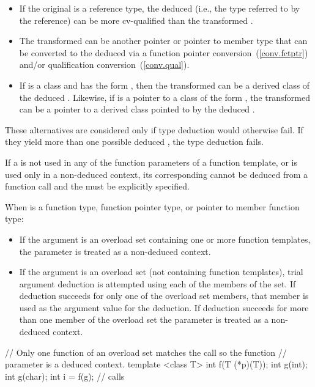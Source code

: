 \begin{itemize}
\item
If the original
is a reference type, the deduced
(i.e.,
the type referred to by the reference) can be more cv-qualified than
the transformed .
\item
The transformed 
can be another pointer or pointer to member type that can be converted
to the deduced
via a function pointer conversion~(\ref{conv.fctptr}) and/or
qualification conversion~(\ref{conv.qual}).

\item
If
is a class and
has the form
,
then
the transformed 
can be a derived class of the
deduced
.
Likewise, if
is a pointer to a class of the form
,
the transformed 
can be a pointer to a
derived class pointed to by the deduced
.
\end{itemize}

\pnum
These alternatives are considered only if type deduction would
otherwise fail.
If they yield more than one possible deduced
,
the type deduction fails.
\begin{note}
If a
is not used in any of the function parameters of a function template,
or is used only in a non-deduced context, its corresponding
cannot be deduced from a function call and the
must be explicitly specified.
\end{note}

\pnum
When
is a function type, function pointer type, or pointer to member
function type:
\begin{itemize}
\item
If the argument is an overload set containing one or more function templates,
the parameter is treated as a non-deduced context.
\item
If the argument is an overload set (not containing function templates), trial
argument deduction is attempted using each of the members of the set. If
deduction succeeds for only one of the overload set members, that member is
used as the argument value for the deduction. If deduction succeeds for more than
one member of the overload set the parameter is treated as a non-deduced context.
\end{itemize}

\pnum
\begin{example}
\begin{codeblock}
// Only one function of an overload set matches the call so the function
// parameter is a deduced context.
template <class T> int f(T (*p)(T));
int g(int);
int g(char);
int i = f(g);       // calls 
\end{codeblock}
\end{example}

